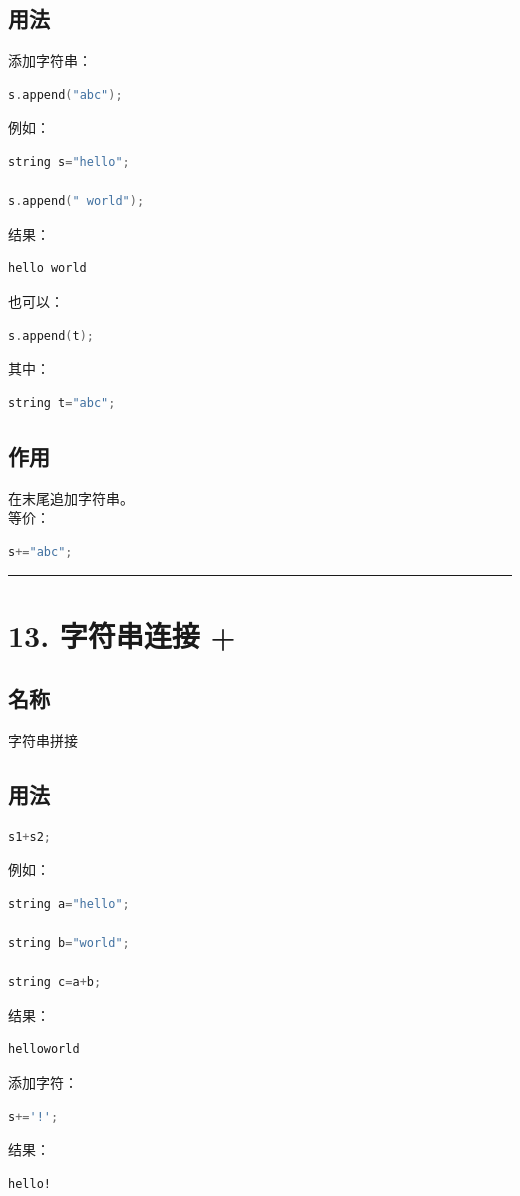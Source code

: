 \documentclass[10pt,twocolumn]{extarticle}
\begin{document}
\subsection{用法}
添加字符串：
\begin{lstlisting}[language=C++]
s.append("abc");
\end{lstlisting}
例如：
\begin{lstlisting}[language=C++]
string s="hello";

s.append(" world");
\end{lstlisting}
结果：
\begin{lstlisting}
hello world
\end{lstlisting}
也可以：
\begin{lstlisting}[language=C++]
s.append(t);
\end{lstlisting}
其中：
\begin{lstlisting}[language=C++]
string t="abc";
\end{lstlisting}

\subsection{作用}
在末尾追加字符串。\\
等价：
\begin{lstlisting}[language=C++]
s+="abc";
\end{lstlisting}

\noindent\rule{\linewidth}{0.4pt}

\section{13. 字符串连接 +}

\subsection{名称}
字符串拼接

\subsection{用法}
\begin{lstlisting}[language=C++]
s1+s2;
\end{lstlisting}
例如：
\begin{lstlisting}[language=C++]
string a="hello";

string b="world";

string c=a+b;
\end{lstlisting}
结果：
\begin{lstlisting}
helloworld
\end{lstlisting}
添加字符：
\begin{lstlisting}[language=C++]
s+='!';
\end{lstlisting}
结果：
\begin{lstlisting}
hello!
\end{lstlisting}
\end{document}
